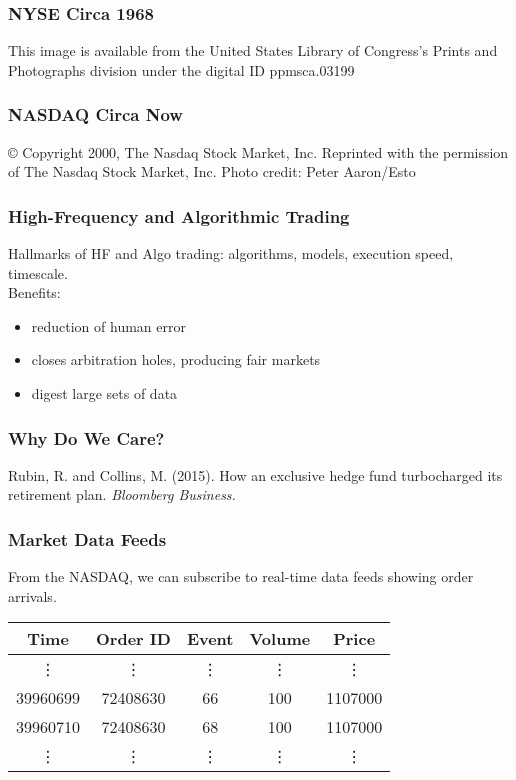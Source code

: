 \begin{frame}
\frametitle{NYSE Circa 1968}
{\tiny This image is available from the United States Library of Congress's Prints and Photographs division under the digital ID ppmsca.03199}
\end{frame}

\begin{frame}
\frametitle{NASDAQ Circa Now}
{\tiny © Copyright 2000, The Nasdaq Stock Market, Inc.
Reprinted with the permission of The Nasdaq Stock Market, Inc.
Photo credit: Peter Aaron/Esto }
\end{frame}
    
\begin{frame}
\frametitle{High-Frequency and Algorithmic Trading}
Hallmarks of HF and Algo trading: algorithms, models, execution speed, timescale. \\
\vspace{\baselineskip}
Benefits: 
\begin{itemize}
\item reduction of human error 
\item closes arbitration holes, producing fair markets
\item digest large sets of data
\end{itemize}
\end{frame}
    
\begin{frame}
\frametitle{Why Do We Care?}
{\tiny Rubin, R. and Collins, M. (2015). How an exclusive hedge fund turbocharged its retirement plan. \textit{Bloomberg Business.}}
\end{frame}

    
\begin{frame}[t]
\frametitle{Market Data Feeds}
From the NASDAQ, we can subscribe to real-time data feeds showing order arrivals.

\begin{center}
\begin{table}
\begin{tabular}{@{} *{5}{c} @{}}
\toprule
Time & Order ID & Event & Volume & Price \\
\midrule
\vdots & \vdots & \vdots & \vdots & \vdots \\
39960699 &72408630 & 66 & 100 & 1107000 \\
39960710 & 72408630 & 68 & 100 & 1107000 \\
\vdots & \vdots & \vdots & \vdots & \vdots \\
\bottomrule
\end{tabular}
\end{table}
\end{center}
\end{frame}
        

